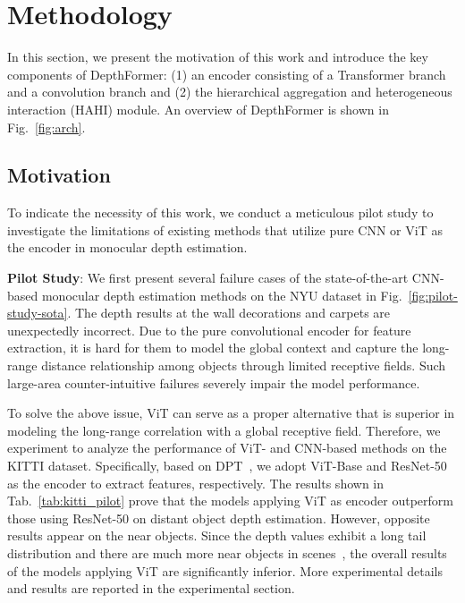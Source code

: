 \documentclass[twocolumn]{svjour3}    \pdfoutput=1
\begin{document}
\section{Methodology}
\label{sec:methodology}

In this section, we present the motivation of this work and introduce the key components of DepthFormer: (1) an encoder consisting of a Transformer branch and a convolution branch and (2) the hierarchical aggregation and heterogeneous interaction (HAHI) module. An overview of DepthFormer is shown in Fig.~\ref{fig:arch}.

\subsection{Motivation}
\label{sec:subsec:motivation}
To indicate the necessity of this work, we conduct a meticulous pilot study to investigate the limitations of existing methods that utilize pure CNN or ViT as the encoder in monocular depth estimation.

\textbf{Pilot Study}: We first present several failure cases of the state-of-the-art CNN-based monocular depth estimation methods on the NYU dataset in Fig.~\ref{fig:pilot-study-sota}. The depth results at the wall decorations and carpets are unexpectedly incorrect. Due to the pure convolutional encoder for feature extraction, it is hard for them to model the global context and capture the long-range distance relationship among objects through limited receptive fields. Such large-area counter-intuitive failures severely impair the model performance.

To solve the above issue, ViT can serve as a proper alternative that is superior in modeling the long-range correlation with a global receptive field. Therefore, we experiment to analyze the performance of ViT- and CNN-based methods on the KITTI dataset. Specifically, based on DPT~\citep{ranftl2021dpt}, we adopt ViT-Base and ResNet-50 as the encoder to extract features, respectively. The results shown in Tab.~\ref{tab:kitti_pilot} prove that the models applying ViT as encoder outperform those using ResNet-50 on distant object depth estimation. However, opposite results appear on the near objects. Since the depth values exhibit a long tail distribution and there are much more near objects in scenes~\citep{jiao2018look}, the overall results of the models applying ViT are significantly inferior. More experimental details and results are reported in the experimental section.
\end{document}

